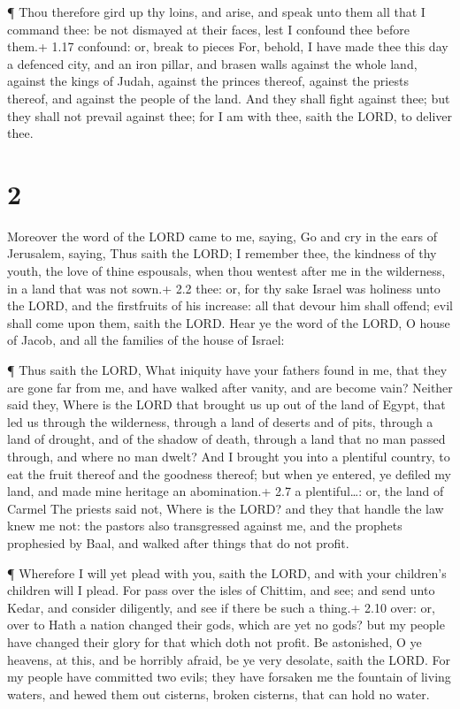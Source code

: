  ¶ Thou therefore gird up thy loins, and arise, and speak
unto them all that I command thee: be not dismayed at their faces, lest
I confound thee before them.+ 1.17 confound: or, break to pieces
 For, behold, I have made thee this day a defenced city,
and an iron pillar, and brasen walls against the whole land, against the
kings of Judah, against the princes thereof, against the priests
thereof, and against the people of the land.  And they
shall fight against thee; but they shall not prevail against thee; for I
am with thee, saith the LORD, to deliver thee.

\hypertarget{section-1}{%
\section{2}\label{section-1}}

 Moreover the word of the LORD came to me, saying,
 Go and cry in the ears of Jerusalem, saying, Thus saith the
LORD; I remember thee, the kindness of thy youth, the love of thine
espousals, when thou wentest after me in the wilderness, in a land that
was not sown.+ 2.2 thee: or, for thy sake  Israel was
holiness unto the LORD, and the firstfruits of his increase: all that
devour him shall offend; evil shall come upon them, saith the LORD.
 Hear ye the word of the LORD, O house of Jacob, and all the
families of the house of Israel:

 ¶ Thus saith the LORD, What iniquity have your fathers
found in me, that they are gone far from me, and have walked after
vanity, and are become vain?  Neither said they, Where is
the LORD that brought us up out of the land of Egypt, that led us
through the wilderness, through a land of deserts and of pits, through a
land of drought, and of the shadow of death, through a land that no man
passed through, and where no man dwelt?  And I brought you
into a plentiful country, to eat the fruit thereof and the goodness
thereof; but when ye entered, ye defiled my land, and made mine heritage
an abomination.+ 2.7 a plentiful\ldots: or, the land of Carmel
 The priests said not, Where is the LORD? and they that
handle the law knew me not: the pastors also transgressed against me,
and the prophets prophesied by Baal, and walked after things that do not
profit.

 ¶ Wherefore I will yet plead with you, saith the LORD, and
with your children's children will I plead.  For pass over
the isles of Chittim, and see; and send unto Kedar, and consider
diligently, and see if there be such a thing.+ 2.10 over: or, over to
 Hath a nation changed their gods, which are yet no gods?
but my people have changed their glory for that which doth not profit.
 Be astonished, O ye heavens, at this, and be horribly
afraid, be ye very desolate, saith the LORD.  For my people
have committed two evils; they have forsaken me the fountain of living
waters, and hewed them out cisterns, broken cisterns, that can hold no
water.

